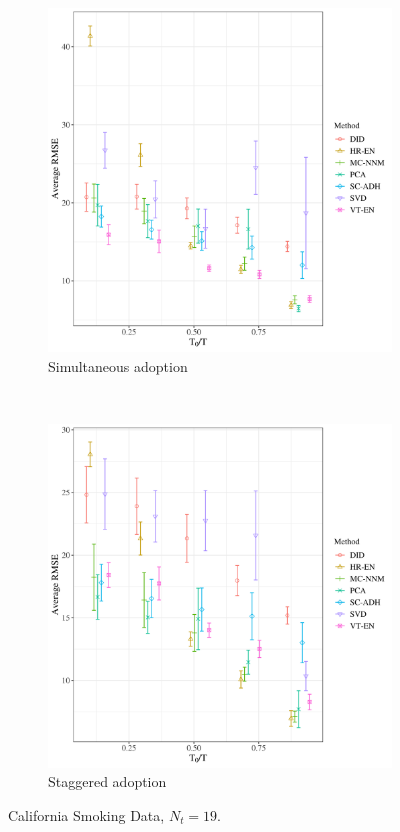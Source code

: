 \documentclass[12pt]{article}
\begin{document}
\begin{figure}[htbp]
	\centering
	\begin{subfigure}[t]{0.45\textwidth}
		\centering
		\includegraphics[width=\textwidth]{plots/california_N_38_T_31_numruns_20_num_treated_19_simultaneuous_1.png}
		\caption{Simultaneous adoption} 
	\end{subfigure}
	~ 
	\begin{subfigure}[t]{0.45\textwidth}
		\centering
		\includegraphics[width=\textwidth]{plots/california_N_38_T_31_numruns_20_num_treated_19_simultaneuous_0.png}
		\caption{Staggered adoption}
	\end{subfigure}
	\caption{California Smoking Data, $N_t = 19$. \label{california}} 
\end{figure}
\end{document}
